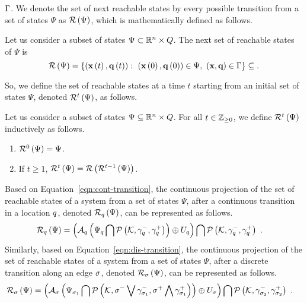 $\Gamma$.  We denote the set of next reachable states by every
possible transition from a set of states $\Psi$ as $\mathcal{R}\left(\Psi\right)$,
which is mathematically defined as follows.
%
\begin{definition}
  Let us consider a subset of states
  $\Psi\subset\mathbb{R}^n\times Q$.  The next set of reachable
  states of $\Psi$ is
%
\[
\mathcal{R}\left(\Psi\right)=\left\{\left({\bf x}\left(t\right),{\bf q}\left(t\right)\right):~\left({\bf x}\left(0\right),{\bf q}\left(0\right)\right)\in\Psi,~\left(\textbf{x},\textbf{q}\right)\in\Gamma\right\}\subseteq.
\]
%
\end{definition}
%
So, we define the set of reachable states at a time $t$ starting from an initial
set of states $\Psi$, denoted $\mathcal{R}^{t}\left(\Psi\right)$, as
follows.
%
\begin{definition}
Let us consider a subset of states
$\Psi\subseteq\mathbb{R}^n\times Q$.  For all $t\in\mathbb{Z}_{\geq
0}$, we define $\mathcal{R}^{t}\left(\Psi\right)$ inductively as follows.
%
\begin{enumerate}
\item $\mathcal{R}^{0}\left(\Psi\right)=\Psi$.
\item If $t\geq 1$, $\mathcal{R}^{t}\left(\Psi\right)=\mathcal{R}\left(\mathcal{R}^{t-1}\left(\Psi\right)\right)$.
\end{enumerate}
%
\end{definition}
%
Based on Equation~\ref{eqn:cont-transition}, the continuous projection
of the set of reachable states of a system from a set of
states $\Psi$, after a continuous transition in a location $q$,
denoted $\mathcal{R}_{q}\left(\Psi\right)$, can be represented as follows.
%
\begin{align}
&
\mathcal{R}_{q}\left(\Psi\right)=\left(\mathcal{A}_q\left(\Psi_q\bigcap{\mathcal{P}\left(\mathcal{K},\gamma_q^-,\gamma_q^+\right)}\right)\oplus U_q\right)\bigcap
\mathcal{P}\left(\mathcal{K},\gamma_q^-,\gamma_q^+\right)~\label{eqn:contreach}.
\end{align}
%
Similarly, based on Equation~\ref{eqn:dis-transition}, the continuous
projection of the set of reachable states of a system from a set of
states $\Psi$, after a discrete transition along an edge $\sigma$,
denoted $\mathcal{R}_{\sigma}\left(\Psi\right)$, can be represented as follows.
%
\begin{align}
&
\mathcal{R}_{\sigma}\left(\Psi\right)=\left(\mathcal{A}_\sigma\left(\Psi_{\sigma_1}\bigcap\mathcal{P}\left(\mathcal{K},\sigma^-\bigvee \gamma_{\sigma_1}^-,\sigma^+\bigwedge \gamma_{\sigma_1}^+\right)\right)\oplus U_{\sigma}\right)\bigcap 
\mathcal{P}\left(\mathcal{K},\gamma_{\sigma_2}^-,\gamma_{\sigma_2}^+\right)~\label{eqn:disreach}.
\end{align}
